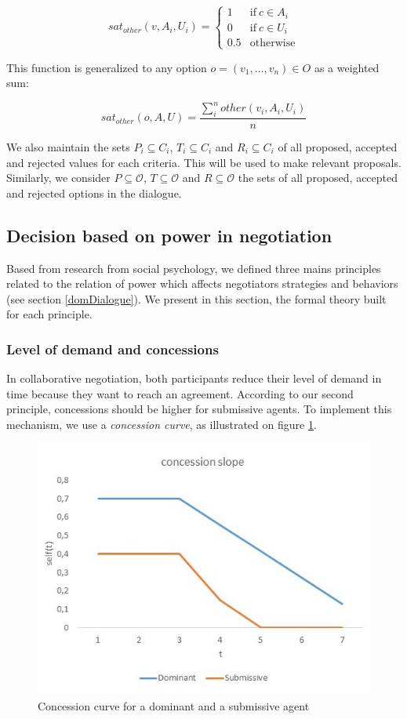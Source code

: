 \documentclass{llncs}
\begin{document}
	\begin{equation}
	sat_{other}(v, A_i, U_i)= \left\{\begin{array}{ll}
	1	 & \mathrm{if\ }  c \in A_i\\
	0    & \mathrm{if\ }c \in U_i\\
	0.5	 & \mathrm{otherwise}
	\end{array}\right.
	\end{equation}
	
	This function is generalized to any option $o=(v_1,\ldots,v_n) \in O$ as a weighted sum:
	
	\begin{equation}
	sat_{other}(o, A, U) = \frac{ \sum_{i}^{n} other(v_i, A_i, U_i) } {n}
	\end{equation}
	
	We also maintain the sets $P_i \subseteq C_i$, $T_i\subseteq C_i$ and $R_i\subseteq C_i$ of all proposed, accepted and rejected values for each criteria. This will be used to make relevant proposals. Similarly, we consider $P\subseteq \mathcal{O}$, $T\subseteq \mathcal{O}$ and $R\subseteq \mathcal{O}$ the sets of all proposed, accepted and rejected options in the dialogue.
	

	\subsection{Decision based on power in negotiation}
	\label{sec:decision}
	Based from research from social psychology, we defined three mains principles related to the relation of power which affects negotiators strategies and behaviors (see section \ref{domDialogue}). We present in this section, the formal theory built for each principle. 
	
	\subsubsection{Level of demand and concessions}
	In collaborative negotiation, both participants reduce their level of demand in time because they want to reach an agreement. According to our second principle, concessions should be higher for submissive agents. To implement this mechanism, we use a \emph{concession curve}, as illustrated on figure \ref{fig:concession}.
	
	 \begin{figure}[t]
		\includegraphics[width=.4\linewidth,keepaspectratio=true]{graphs/slope.jpg}
		\caption{\label{fig:concession}Concession curve for a dominant and a submissive agent}
	 \end{figure}
	 
\end{document}
